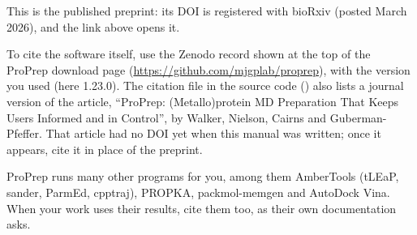 This is the published preprint: its DOI is registered with bioRxiv
(posted March 2026), and the link above opens it.

To cite the software itself, use the Zenodo record shown at the top of the
ProPrep download page (\url{https://github.com/mjgplab/proprep}), with the version
you used (here 1.23.0). The citation file in the source code
() also lists a journal version of the article, ``ProPrep:
(Metallo)protein MD Preparation That Keeps Users Informed and in Control'', by
Walker, Nielson, Cairns and Guberman-Pfeffer. That article had no DOI yet when
this manual was written; once it appears, cite it in place of the preprint.

ProPrep runs many other programs for you, among them AmberTools (tLEaP, sander,
ParmEd, cpptraj), PROPKA, packmol-memgen and AutoDock Vina. When your work uses
their results, cite them too, as their own documentation asks.
